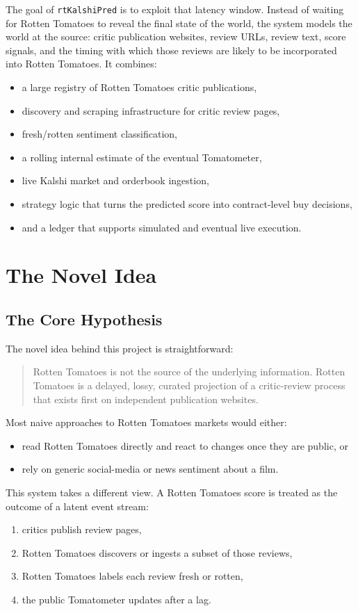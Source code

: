 \documentclass[11pt]{article}
\begin{document}
The goal of \texttt{rtKalshiPred} is to exploit that latency window. Instead of waiting for Rotten Tomatoes to reveal the final state of the world, the system models the world at the source: critic publication websites, review URLs, review text, score signals, and the timing with which those reviews are likely to be incorporated into Rotten Tomatoes. It combines:
\begin{itemize}[leftmargin=1.5em]
    \item a large registry of Rotten Tomatoes critic publications,
    \item discovery and scraping infrastructure for critic review pages,
    \item fresh/rotten sentiment classification,
    \item a rolling internal estimate of the eventual Tomatometer,
    \item live Kalshi market and orderbook ingestion,
    \item strategy logic that turns the predicted score into contract-level buy decisions,
    \item and a ledger that supports simulated and eventual live execution.
\end{itemize}

\section{The Novel Idea}
\subsection{The Core Hypothesis}
The novel idea behind this project is straightforward:
\begin{quote}
Rotten Tomatoes is not the source of the underlying information. Rotten Tomatoes is a delayed, lossy, curated projection of a critic-review process that exists first on independent publication websites.
\end{quote}

Most naive approaches to Rotten Tomatoes markets would either:
\begin{itemize}[leftmargin=1.5em]
    \item read Rotten Tomatoes directly and react to changes once they are public, or
    \item rely on generic social-media or news sentiment about a film.
\end{itemize}

This system takes a different view. A Rotten Tomatoes score is treated as the outcome of a latent event stream:
\begin{enumerate}[leftmargin=1.5em]
    \item critics publish review pages,
    \item Rotten Tomatoes discovers or ingests a subset of those reviews,
    \item Rotten Tomatoes labels each review fresh or rotten,
    \item the public Tomatometer updates after a lag.
\end{enumerate}
\end{document}
